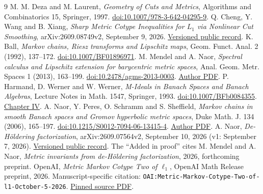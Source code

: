 \documentclass[11pt]{article}
\newcommand{\1}{\mathbf1}
\begin{document}
\begin{thebibliography}{9}
 M. M. Deza and M. Laurent, \emph{Geometry of Cuts and Metrics}, Algorithms and Combinatorics 15, Springer, 1997. \href{https://doi.org/10.1007/978-3-642-04295-9}{doi:10.1007/978-3-642-04295-9}.
 Q. Cheng, Y. Wang and B. Xiang, \emph{Sharp Metric Cotype Inequalities for $L_1$ via Nonlinear Cut Smoothing}, arXiv:2609.08749v2, September 9, 2026. \href{https://arxiv.org/abs/2609.08749v2}{Versioned public record}.
 K. Ball, \emph{Markov chains, Riesz transforms and Lipschitz maps}, Geom. Funct. Anal. 2 (1992), 137--172. \href{https://doi.org/10.1007/BF01896971}{doi:10.1007/BF01896971}.
 M. Mendel and A. Naor, \emph{Spectral calculus and Lipschitz extension for barycentric metric spaces}, Anal. Geom. Metr. Spaces 1 (2013), 163--199. \href{https://doi.org/10.2478/agms-2013-0003}{doi:10.2478/agms-2013-0003}. \href{https://web.math.princeton.edu/~naor/homepage\%20files/cat0-extension.pdf}{Author PDF}.
 P. Harmand, D. Werner and W. Werner, \emph{M-Ideals in Banach Spaces and Banach Algebras}, Lecture Notes in Math. 1547, Springer, 1993. \href{https://doi.org/10.1007/BFb0084355}{doi:10.1007/BFb0084355}. \href{https://page.mi.fu-berlin.de/werner99/mbuch/buch4.pdf}{Chapter IV}.
 A. Naor, Y. Peres, O. Schramm and S. Sheffield, \emph{Markov chains in smooth Banach spaces and Gromov hyperbolic metric spaces}, Duke Math. J. 134 (2006), 165--197. \href{https://doi.org/10.1215/S0012-7094-06-13415-4}{doi:10.1215/S0012-7094-06-13415-4}. \href{https://web.math.princeton.edu/~naor/homepage\%20files/Mtype.pdf}{Author PDF}.
 A. Naor, \emph{De-H\"oldering factorization}, arXiv:2609.07564v2, September 10, 2026 (v1: September 7, 2026). \href{https://arxiv.org/abs/2609.07564v2}{Versioned public record}. The ``Added in proof'' cites M. Mendel and A. Naor, \emph{Metric invariants from de-H\"oldering factorization}, 2026, forthcoming preprint.
 OpenAI, \emph{Metric Markov Cotype Two of $\ell_1$}, OpenAI Math Release preprint, 2026. Manuscript-specific citation: \texttt{OAI:Metric-Markov-Cotype-Two-of-l1-October-5-2026}. \href{https://github.com/openai/math/blob/adc7f1241b42e322a6451854ab7e4b4c146bf78a/preprints/Metric-Markov-Cotype-Two-of-l1-October-5-2026/l1-markov-cotype.pdf}{Pinned source PDF}.
\end{thebibliography}
\end{document}
